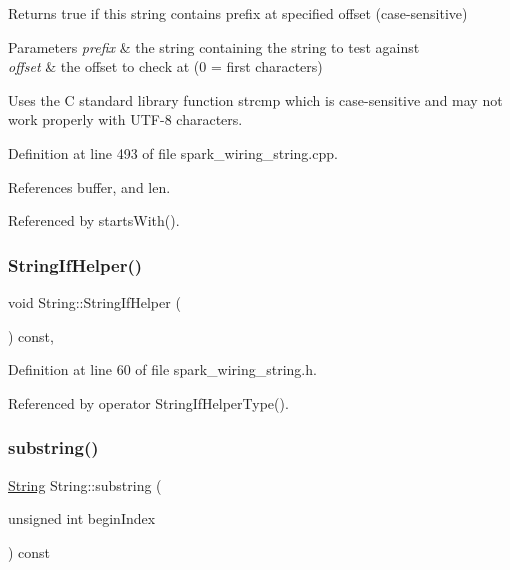 Returns true if this string contains prefix at specified offset (case-\/sensitive) 


\begin{DoxyParams}{Parameters}
{\em prefix} & the string containing the string to test against\\
\hline
{\em offset} & the offset to check at (0 = first characters)\\
\hline
\end{DoxyParams}
Uses the C standard library function strcmp which is case-\/sensitive and may not work properly with U\+T\+F-\/8 characters. 

Definition at line 493 of file spark\+\_\+wiring\+\_\+string.\+cpp.



References buffer, and len.



Referenced by starts\+With().

\mbox{\label{class_string_a7587eade7e0df22dca2c424df32198de}} 
\subsubsection{\texorpdfstring{String\+If\+Helper()}{StringIfHelper()}}
{\footnotesize\ttfamily void String\+::\+String\+If\+Helper (\begin{DoxyParamCaption}{ }\end{DoxyParamCaption}) const\hspace{0.3cm}{\ttfamily [inline]}, {\ttfamily [private]}}



Definition at line 60 of file spark\+\_\+wiring\+\_\+string.\+h.



Referenced by operator String\+If\+Helper\+Type().

\mbox{\label{class_string_a36b10b81c1556de6e5c63fd060347f30}} 
\subsubsection{\texorpdfstring{substring()}{substring()}\hspace{0.1cm}{\footnotesize\ttfamily [1/2]}}
{\footnotesize\ttfamily \hyperlink{class_string}{String} String\+::substring (\begin{DoxyParamCaption}\item[{unsigned int}]{begin\+Index }\end{DoxyParamCaption}) const}



